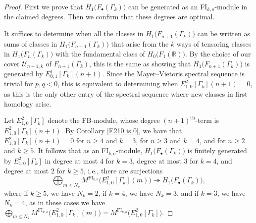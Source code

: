 \documentclass[pagebackref,colorlinks,citecolor=blue,linkcolor=blue,urlcolor=blue,filecolor=blue]{article}
\theoremstyle{definition}\newtheorem{definition}[thm]{Definition}
\theoremstyle{definition}
\newcommand{\R}{\ensuremath{\mathbb{R}}}
\begin{document}
\begin{proof}
First we prove that $H_{1}\big(F_{\bullet}(\Gamma_{k})\big)$ can be generated as an FI$_{k, o}$-module in the claimed degrees.
Then we confirm that these degrees are optimal.

It suffices to determine when all the classes in $H_{1}\big(F_{n+1}(\Gamma_{k})\big)$ can be written as sums of classes in $H_{1}\big(F_{n+1}(\Gamma_{k})\big)$ that arise from the $k$ ways of tensoring classes in $H_{1}\big(F_{n}(\Gamma_{k})\big)$ with the fundamental class of $H_{0}\big(F_{1}(\R)\big)$.
By the choice of our cover $\mathcal{U}_{n+1, k}$ of $F_{n+1}(\Gamma_{k})$, this is the same as showing that $H_{1}\big(F_{n+1}(\Gamma_{k})\big)$ is generated by $E^{1}_{0,1}[\Gamma_{k}](n+1)$.
Since the Mayer--Vietoris spectral sequence is trivial for $p, q<0$, this is equivalent to determining when $E^{2}_{1,0}[\Gamma_{k}](n+1)=0$, as this is the only other entry of the spectral sequence where new classes in first homology arise.

Let $E^{2}_{1, 0}[\Gamma_{k}]$ denote the FB-module, whose degree $(n+1)^{\text{th}}$-term is $E^{2}_{1,0}[\Gamma_{k}](n+1)$.
By Corollary \ref{E210 is 0}, we have that $E^{2}_{1,0}[\Gamma_{k}](n+1)=0$ for $n\ge 4$ and $k=3$, for $n\ge 3$ and $k=4$, and for $n\ge 2$ and $k\ge 5$.
It follows that as an FI$_{k,o}$-module, $H_{1}\big(F_{\bullet}(\Gamma_{k})\big)$ is finitely generated by $E^{2}_{1, 0}[\Gamma_{k}]$ in degree at most $4$ for $k=3$, degree at most $3$ for $k=4$, and degree at most $2$ for $k\ge 5$, i.e., there are surjections
\[
\bigoplus_{m\le N_{k}}M^{\text{FI}_{k, o}}\big(E^{2}_{1,0}[\Gamma_{k}](m)\big)\twoheadrightarrow H_{1}\big(F_{\bullet}(\Gamma_{k})\big),
\]
where if $k\ge 5$, we have $N_{k}=2$, if $k=4$, we have $N_{k}=3$, and if $k=3$, we have $N_{k}=4$, as in these cases we have $\bigoplus_{m\le N_{k}}M^{\text{FI}_{k, o}}\big(E^{2}_{1,0}[\Gamma_{k}](m)\big)=M^{\text{FI}_{k, o}}\big(E^{2}_{1,0}[\Gamma_{k}]\big)$.


\end{proof}
\end{document}
